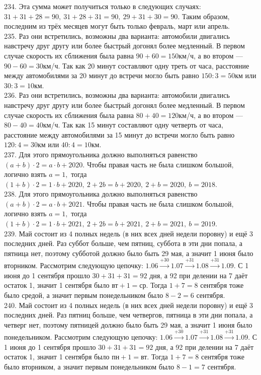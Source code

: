 \documentclass[12pt]{article}
\begin{document}
234. Эта сумма может получиться только в следующих случаях: $31+31+28=90,\ 31+28+31=90,\ 29+31+30=90.$ Таким образом, последним из трёх месяцев могут быть только февраль, март или апрель.\\
235. Раз они встретились, возможны два варианта: автомобили двигались навстречу друг другу или более быстрый догонял более медленный. В первом случае скорость их сближения была равна $90+60=150$км/ч, а во втором --- $90-60=30$км/ч. Так как 20 минут составляют одну треть от часа, расстояние между автомобилями за 20 минут до встречи могло быть равно $150:3=50$км или $30:3=10$км.\\
236. Раз они встретились, возможны два варианта: автомобили двигались навстречу друг другу или более быстрый догонял более медленный. В первом случае скорость их сближения была равна $80+40=120$км/ч, а во втором --- $80-40=40$км/ч. Так как 15 минут составляют одну четверть от часа, расстояние между автомобилями за 15 минут до встречи могло быть равно $120:4=30$км или $40:4=10$км.\\
237. Для этого прямоугольника должно выполняться равенство $(a+b)\cdot2=a\cdot b+2020.$ Чтобы правая часть не была слишком большой, логично взять $a=1,$ тогда
$(1+b)\cdot 2=1\cdot b+2020,\ 2+2b=b+2020,\ 2+b=2020,\ b=2018.$\\
238. Для этого прямоугольника должно выполняться равенство $(a+b)\cdot2=a\cdot b+2021.$ Чтобы правая часть не была слишком большой, логично взять $a=1,$ тогда
$(1+b)\cdot 2=1\cdot b+2021,\ 2+2b=b+2021,\ 2+b=2021,\ b=2019.$\\
239. Май состоит из 4 полных недель (в них всех дней недели поровну) и ещё 3 последних дней. Раз суббот больше, чем пятниц, суббота в эти дни попала, а пятница нет, поэтому субботой должно было быть 29 мая, а значит 1 июня было вторником. Рассмотрим следующую цепочку:
$1.06\stackrel{+30}{\rightarrow}1.07\stackrel{+31}{\rightarrow}1.08\stackrel{+31}{\rightarrow}1.09.$ С 1 июня до 1 сентября прошло $30+31+31=92$ дня, а 92 при делении на 7 даёт остаток 1, значит 1 сентября было $\text{вт}+1=\text{ср}.$ Тогда $1+7=8$ сентября тоже было средой, а значит первым понедельником было $8-2=6$ сентября.\\
240. Май состоит из 4 полных недель (в них всех дней недели поровну) и ещё 3 последних дней. Раз пятниц больше, чем четвергов, пятница в эти дни попала, а четверг нет, поэтому пятницей должно было быть 29 мая, а значит 1 июня было понедельником. Рассмотрим следующую цепочку:
$1.06\stackrel{+30}{\rightarrow}1.07\stackrel{+31}{\rightarrow}1.08\stackrel{+31}{\rightarrow}1.09.$ С 1 июня до 1 сентября прошло $30+31+31=92$ дня, а 92 при делении на 7 даёт остаток 1, значит 1 сентября было $\text{пн}+1=\text{вт}.$ Тогда $1+7=8$ сентября тоже было вторником, а значит первым понедельником было $8-1=7$ сентября.\\
\end{document}
